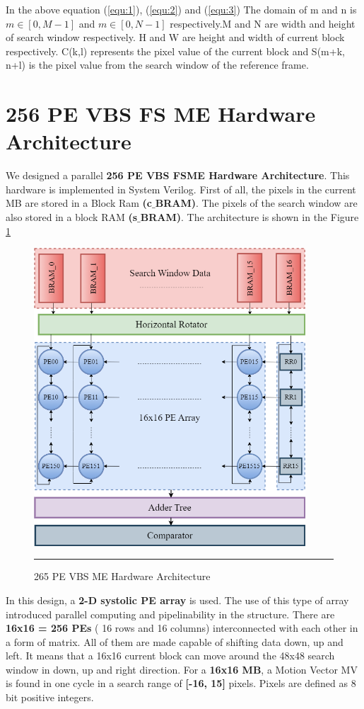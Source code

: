 In the above equation (\ref{equ:1}), (\ref{equ:2}) and (\ref{equ:3}) The domain of m and n is $m \in [0, M-1] $ and $m \in [0, N-1]$ respectively.M and N are width and height of search window respectively. H and W are height and width of current block respectively. C(k,l) represents the pixel value of the current block and S(m+k, n+l) is the pixel value from the search window of the reference frame.\cite{li2003serial} \\

\section{256 PE VBS FS ME Hardware Architecture}
We designed a parallel \textbf{256 PE VBS FSME Hardware Architecture}. \cite{kalaycioglu2011low} This hardware is implemented in System Verilog. First of all, the pixels in the current MB are stored in a Block Ram \textbf{(c$\_$BRAM)}. The pixels of the search window are also stored in a block RAM \textbf{(s$\_$BRAM)}. The architecture is shown in the Figure \ref{fig:256pevbsme}

\begin{figure}[H]
	\centering
	\includegraphics[width = 4in]{./Figures/256pevbsme.png}
	\rule{35em}{0.5pt}
	\caption{265 PE VBS ME Hardware Architecture}
	\label{fig:256pevbsme}
\end{figure}

In this design, a \textbf{2-D systolic PE array} is used. The use of this type of array introduced parallel computing and pipelinability in the structure. There are \textbf{16x16 = 256 PEs} ( 16 rows and 16 columns) interconnected with each other in a form of matrix. All of them are  made capable of shifting data down, up and left. It means that a 16x16 current block can move around the 48x48 search window in down, up and right direction. For a \textbf{16x16 MB}, a Motion Vector MV is found in one cycle in a search range of \textbf{[-16, 15]} pixels. Pixels are defined as 8 bit positive integers.

